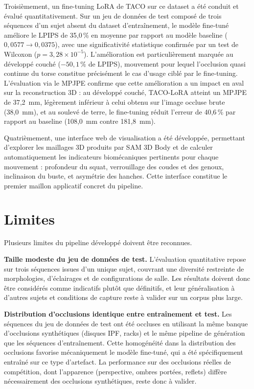 Troisièmement, un fine-tuning LoRA de TACO sur ce dataset a été conduit et évalué quantitativement. Sur un jeu de données de test composé de trois séquences d'un sujet absent du dataset d'entraînement, le modèle fine-tuné améliore le LPIPS de 35,0\,\% en moyenne par rapport au modèle baseline ($0{,}0577 \rightarrow 0{,}0375$), avec une significativité statistique confirmée par un test de Wilcoxon ($p = 3{,}28 \times 10^{-5}$). L'amélioration est particulièrement marquée au développé couché ($-50{,}1\,\%$ de LPIPS), mouvement pour lequel l'occlusion quasi continue du torse constitue précisément le cas d'usage ciblé par le fine-tuning. L'évaluation via le MPJPE confirme que cette amélioration a un impact en aval sur la reconstruction 3D : au développé couché, TACO-LoRA atteint un MPJPE de 37,2~mm, légèrement inférieur à celui obtenu sur l'image occluse brute (38,0~mm), et au soulevé de terre, le fine-tuning réduit l'erreur de 40,6\,\% par rapport au baseline (108,0~mm contre 181,8~mm).

Quatrièmement, une interface web de visualisation a été développée, permettant d'explorer les maillages 3D produits par SAM 3D Body et de calculer automatiquement les indicateurs biomécaniques pertinents pour chaque mouvement : profondeur du squat, verrouillage des coudes et des genoux, inclinaison du buste, et asymétrie des hanches. Cette interface constitue le premier maillon applicatif concret du pipeline.

\section{Limites} \label{sec:limites}

Plusieurs limites du pipeline développé doivent être reconnues.

\textbf{Taille modeste du jeu de données de test.} L'évaluation quantitative repose sur trois séquences issues d'un unique sujet, couvrant une diversité restreinte de morphologies, d'éclairages et de configurations de salle. Les résultats doivent donc être considérés comme indicatifs plutôt que définitifs, et leur généralisation à d'autres sujets et conditions de capture reste à valider sur un corpus plus large.

\textbf{Distribution d'occlusions identique entre entraînement et test.} Les séquences du jeu de données de test ont été occluses en utilisant la même banque d'occlusions synthétiques (disques IPF, racks) et le même pipeline de génération que les séquences d'entraînement. Cette homogénéité dans la distribution des occlusions favorise mécaniquement le modèle fine-tuné, qui a été spécifiquement entraîné sur ce type d'artefact. La performance sur des occlusions réelles de compétition, dont l'apparence (perspective, ombres portées, reflets) diffère nécessairement des occlusions synthétiques, reste donc à valider.

